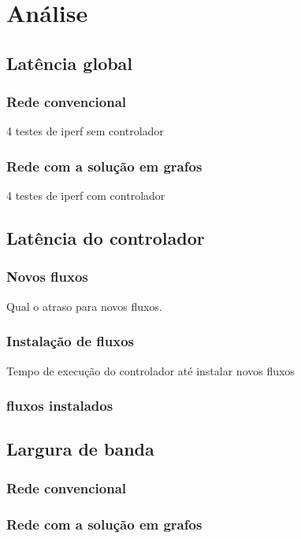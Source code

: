 \chapter{Análise}


\section{Latência global}

\subsection{Rede convencional}
4 testes de iperf sem controlador
\subsection{Rede com a solução em grafos}
4 testes de iperf com controlador


\section{Latência do controlador}

\subsection{Novos fluxos}
Qual o atraso para novos fluxos.

\subsection{Instalação de fluxos}
Tempo de execução do controlador até instalar novos fluxos

\subsection{fluxos instalados}


\section{Largura de banda}

\subsection{Rede convencional}
\subsection{Rede com a solução em grafos}


